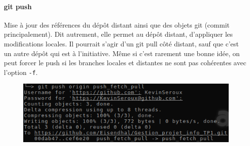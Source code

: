 \documentclass[11pt,canadien]{article}
\begin{document}
\paragraph{git push}Mise à jour des références du dépôt distant ainsi que des objets git (commit principalement). Dit autrement, elle permet au dépôt distant, d'appliquer les modifications locales. Il pourrait s'agir d'un git pull côté distant, sauf que c'est un autre dépôt qui est à l'initiative. Même si c'est rarement une bonne idée, on peut forcer le push si les branches locales et distantes ne sont pas cohérentes avec l'option \texttt{-f}.
\begin{figure}[H]
	\centering
	\includegraphics{images/git_push.png}
\end{figure}
\end{document}
